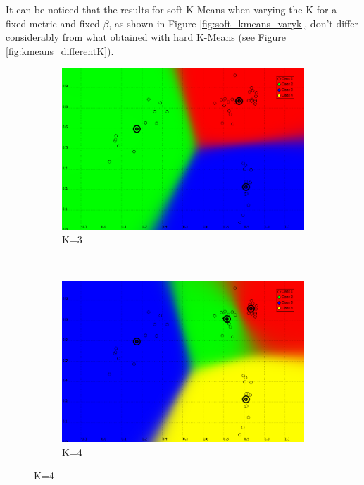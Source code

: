 \documentclass[a4paper,10pt]{article}
\begin{document}
It can be noticed that the results for soft K-Means when varying the K for a fixed metric and fixed $\beta$, as shown in Figure \ref{fig:soft_kmeans_varyk}, don't differ considerably from what obtained with hard K-Means (see Figure \ref{fig:kmeans_differentK}).

\begin{figure}[H]
\centering
    \begin{subfigure}[t]{0.2\textwidth}
      \centering
      \includegraphics[width=\textwidth]{pictures/dataset_1_soft-Kmeans-3K-beta30}
      \caption{K=3}
      \label{fig:dataset_1_soft-Kmeans-3K-beta30}
     \end{subfigure}
      ~
    \begin{subfigure}[t]{0.2\textwidth}
      \centering
      \includegraphics[width=\textwidth]{pictures/dataset_1_soft-Kmeans-4K-beta30-2}
      \caption{K=4}
      \label{fig:dataset_1_soft-Kmeans-4K-beta30-2}

\end{subfigure}
\end{figure}
\end{document}
